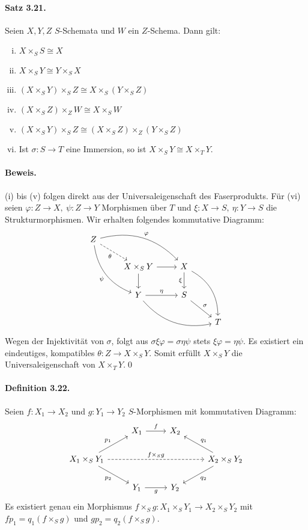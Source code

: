 \paragraph{Satz 3.21.}\label{3.21} Seien $X,Y,Z$ $S$-Schemata und $W$ ein $Z$-Schema. Dann gilt:
\begin{enumerate}[(i)]
\item $X\times_SS\cong X$
\item $X\times_SY\cong Y\times_SX$
\item $(X\times_SY)\times_SZ\cong X\times_S(Y\times_SZ)$
\item $(X\times_SZ)\times_ZW\cong X\times_SW$
\item $(X\times_SY)\times_SZ\cong (X\times_SZ)\times_Z(Y\times_SZ)$
\item Ist $\sigma:S\to T$ eine Immersion, so ist $X\times_SY\cong X\times_TY$.
\end{enumerate}

\paragraph{Beweis.} (i) bis (v) folgen direkt aus der Universaleigenschaft des Faserprodukts. Für (vi) seien $\varphi:Z\to X,\ \psi:Z\to Y$ Morphismen über $T$ und $\xi:X\to S,\ \eta:Y\to S$ die Strukturmorphismen. Wir erhalten folgendes kommutative Diagramm:
\[ \begin{tikzcd}
Z\ar[rrd, "\varphi", bend left]\ar[rd, "\theta"', dashed]\ar[ddr, "\psi"', bend right]\\
& X\ar[r]\ar[d]\times_SY & X\ar[d, "\xi"']\ar[ddr, bend left] &\\
& Y\ar[r, "\eta"]\ar[rrd, bend right] & S\ar[dr, "\sigma"]&\\
&&&T
\end{tikzcd}\]
Wegen der Injektivität von $\sigma$, folgt aus $\sigma\xi\varphi=\sigma\eta\psi$ stets $\xi\varphi=\eta\psi$. Es existiert ein eindeutiges, kompatibles $\theta:Z\to X\times_SY$. Somit erfüllt $X\times_SY$ die Universaleigenschaft von $X\times_TY$.\qed

\paragraph{Definition 3.22.}\label{3.22} Seien $f:X_1\to X_2$ und $g:Y_1\to Y_2$ $S$-Morphismen mit kommutativen Diagramm:
\[\begin{tikzcd}
&X_1 \ar[r, "f"]& X_2\\
X_1\times_SY_1\ar[dr, "p_2"']\ar[ur, "p_1"]\ar[rrr, "f\times_Sg", dashed] &&& X_2\times_SY_2\ar[lu, "q_1"']\ar[ld, "q_2"]\\
& Y_1\ar[r, "g"']&Y_2
\end{tikzcd} \]
Es existiert genau ein Morphismus $f\times_Sg: X_1\times_SY_1\to X_2\times_SY_2$ mit $fp_1=q_1(f\times_Sg)$ und $gp_2=q_2(f\times_Sg)$.

